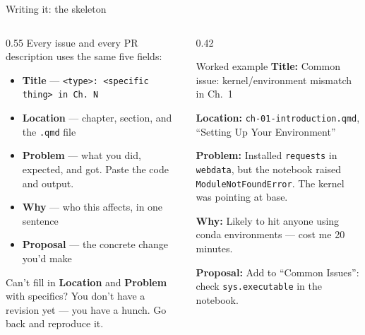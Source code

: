 \documentclass[9pt,aspectratio=169]{beamer}
\begin{document}
\begin{frame}{Writing it: the skeleton}
    \begin{columns}[T]
        \begin{column}{0.55\textwidth}
            Every issue and every PR description uses the same five fields:

            \vspace{0.5em}

            \begin{itemize}\small
                \item \textbf{Title} --- \texttt{<type>: <specific thing> in Ch. N}
                \item \textbf{Location} --- chapter, section, and the \texttt{.qmd} file
                \item \textbf{Problem} --- what you did, expected, and got. Paste the code and output.
                \item \textbf{Why} --- who this affects, in one sentence
                \item \textbf{Proposal} --- the concrete change you'd make
            \end{itemize}

            \vspace{0.5em}

            {\footnotesize Can't fill in \textbf{Location} and \textbf{Problem} with specifics? You don't have a revision yet --- you have a hunch. Go back and reproduce it.}
        \end{column}
        \begin{column}{0.42\textwidth}
            \begin{block}{Worked example}
                \footnotesize
                \textbf{Title:} Common issue: kernel/environment mismatch in Ch.~1
                \vspace{0.2em}

                \textbf{Location:} \texttt{ch-01-introduction.qmd}, ``Setting Up Your Environment''
                \vspace{0.2em}

                \textbf{Problem:} Installed \texttt{requests} in \texttt{webdata}, but the notebook raised \texttt{ModuleNotFoundError}. The kernel was pointing at base.
                \vspace{0.2em}

                \textbf{Why:} Likely to hit anyone using conda environments --- cost me 20 minutes.
                \vspace{0.2em}

                \textbf{Proposal:} Add to ``Common Issues'': check \texttt{sys.executable} in the notebook.
            \end{block}
        \end{column}
    \end{columns}
\end{frame}
\end{document}
